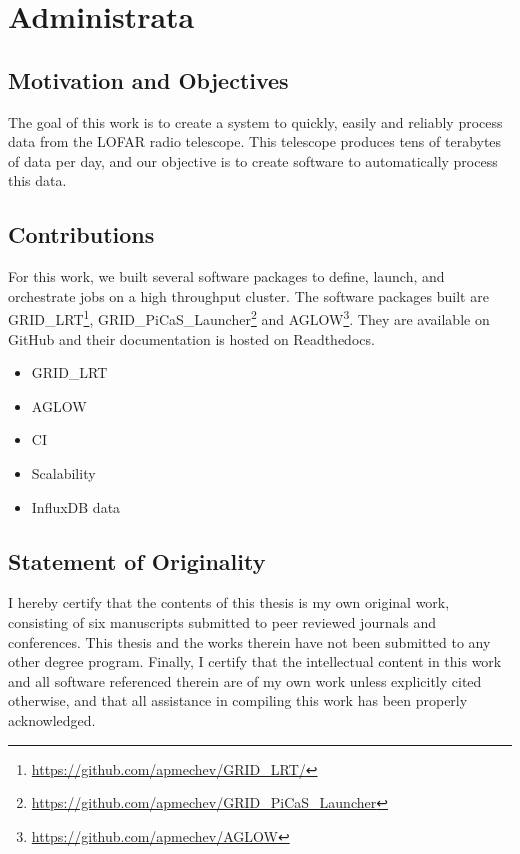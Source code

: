 \section{Administrata}

\subsection{Motivation and Objectives}

The goal of this work is to create a system to quickly, easily and reliably process data from the LOFAR radio telescope. This telescope produces tens of terabytes of data per day, and our objective is to create software to automatically process this data.  

\subsection{Contributions}
 
For this work, we built several software packages to define, launch, and orchestrate jobs on a high throughput cluster. The software packages built are GRID\_LRT\footnote{\url{https://github.com/apmechev/GRID_LRT/}}, GRID\_PiCaS\_Launcher\footnote{\url{https://github.com/apmechev/GRID_PiCaS_Launcher}} and AGLOW\footnote{\url{https://github.com/apmechev/AGLOW}}. They are available on GitHub and their documentation is hosted on Readthedocs.  


\begin{itemize}
\item GRID\_LRT
\item AGLOW
\item CI
\item Scalability
\item InfluxDB data
\end{itemize}

\subsection{Statement of Originality}

I hereby certify that the contents of this thesis is my own original work, consisting of six manuscripts submitted to peer reviewed journals and conferences. This thesis and the works therein have not been submitted to any other degree program. Finally, I certify that the intellectual content in this work and all software referenced therein are of my own work unless explicitly cited otherwise, and that all assistance in compiling this work has been properly acknowledged.

